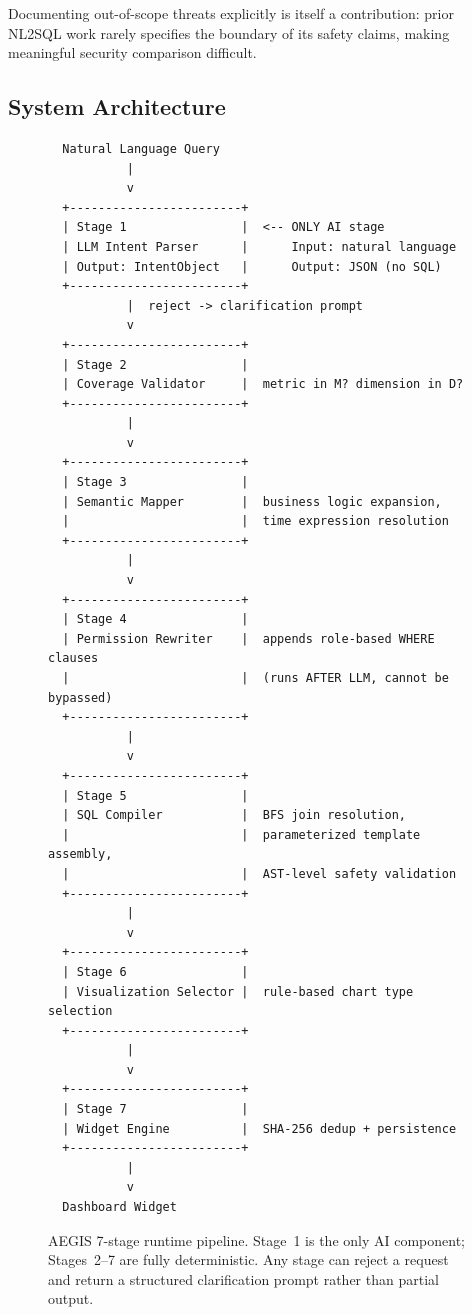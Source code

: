 \documentclass[11pt]{article}
\begin{document}
\noindent Documenting out-of-scope threats explicitly is itself a contribution: prior NL2SQL work rarely specifies the boundary of its safety claims, making meaningful security comparison difficult.

\subsection{System Architecture\label{sec:architecture}}
\begin{figure}[h]
\centering
\begin{verbatim}
  Natural Language Query
           |
           v
  +------------------------+
  | Stage 1                |  <-- ONLY AI stage
  | LLM Intent Parser      |      Input: natural language
  | Output: IntentObject   |      Output: JSON (no SQL)
  +------------------------+
           |  reject -> clarification prompt
           v
  +------------------------+
  | Stage 2                |
  | Coverage Validator     |  metric in M? dimension in D?
  +------------------------+
           |
           v
  +------------------------+
  | Stage 3                |
  | Semantic Mapper        |  business logic expansion,
  |                        |  time expression resolution
  +------------------------+
           |
           v
  +------------------------+
  | Stage 4                |
  | Permission Rewriter    |  appends role-based WHERE clauses
  |                        |  (runs AFTER LLM, cannot be bypassed)
  +------------------------+
           |
           v
  +------------------------+
  | Stage 5                |
  | SQL Compiler           |  BFS join resolution,
  |                        |  parameterized template assembly,
  |                        |  AST-level safety validation
  +------------------------+
           |
           v
  +------------------------+
  | Stage 6                |
  | Visualization Selector |  rule-based chart type selection
  +------------------------+
           |
           v
  +------------------------+
  | Stage 7                |
  | Widget Engine          |  SHA-256 dedup + persistence
  +------------------------+
           |
           v
  Dashboard Widget
\end{verbatim}
\caption{AEGIS 7-stage runtime pipeline. Stage~1 is the only AI component; Stages~2--7 are fully deterministic. Any stage can reject a request and return a structured clarification prompt rather than partial output.}\label{fig:pipeline}
\end{figure}
\end{document}
